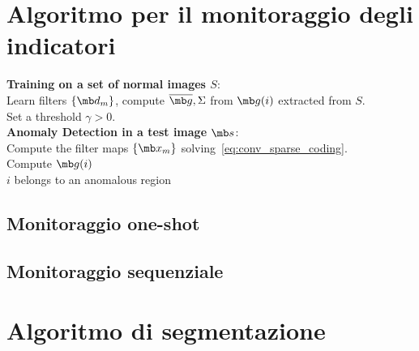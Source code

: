 \section{Algoritmo per il monitoraggio degli indicatori}
\IncMargin{0.1em}
\vspace{-0.2cm}
\begin{algorithm}[h!]
	\LinesNumbered
	\textbf{Training on a set of normal images $S$}:\\
	 Learn filters $\{\mb d_m\}$, compute $\overline{\mb g}, \Sigma$ from $\mb g(i)$ extracted from $S$. \\
	 Set a threshold $\gamma > 0$.\\
	\textbf{Anomaly Detection in a test image $\mb s$}:\\
	 Compute the filter maps $\{\mb x_m\}$ solving~\eqref{eq:conv_sparse_coding}. \\
	 
	{
		 Compute $\mb g(i)$\\
		 
		{
			 $i$ belongs to an anomalous region\\
		}
	}   
	\label{alg:ALG1}
\end{algorithm}
\subsection{Monitoraggio one-shot}
\subsection{Monitoraggio sequenziale}
\section{Algoritmo di segmentazione}
\label{segmentazione}

